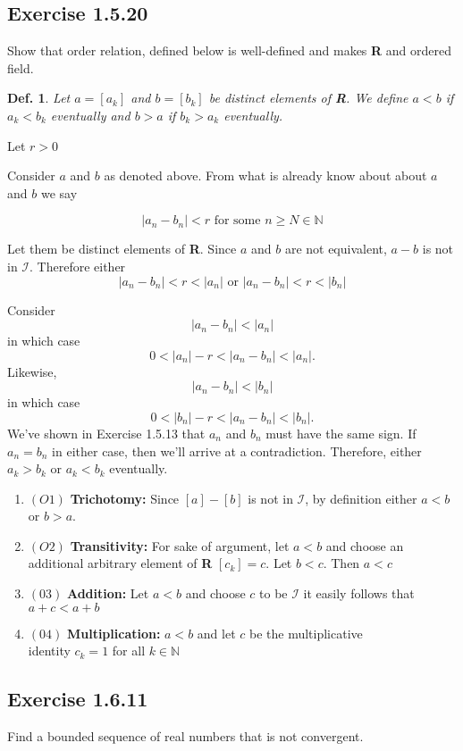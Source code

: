 \documentclass{tufte-book}
\theoremstyle{mytheoremstyle}
\theoremstyle{mylemstyle}
\theoremstyle{mydefstyle}
\newtheorem*{mydef}{Def.}
\begin{document}
\subsection{Exercise 1.5.20}
Show that order relation, defined below is well-defined and makes \textbf{R} and ordered field. 

\begin{mydef}Let $a = [a_k]$ and $b=[b_k]$ be distinct elements of \textbf{R}. We define $a<b$ if $a_k < b_k$ eventually and $b>a$ if $b_k > a_k$ eventually.
\end{mydef}

Let $r > 0$


Consider $a$ and $b$ as denoted above. From what is already know about about $a$ and $b$ we say

\[|a_n - b_n| < r \text{ for some } n \geq N \in \mathbb{N}\] 

Let them be distinct elements of \textbf{R}. Since $a$ and $b$ are not equivalent, $a-b$ is not in $\mathcal{I}$. Therefore either
\[|a_n - b_n| < r < |a_n| \text{ or } |a_n - b_n| < r < |b_n| \]

Consider
\[|a_n-b_n| < |a_n|\]
in which case
\[0 < |a_n| - r < |a_n-b_n| < |a_n| .\]
Likewise,
\[|a_n-b_n| < |b_n|\]
in which case
\[0 < |b_n| - r < |a_n-b_n| < |b_n| .\]
We've shown in Exercise 1.5.13 that $a_n$ and $b_n$ must have the same sign. If $a_n=b_n$ in either case, then we'll arrive at a contradiction.  Therefore, either $a_k > b_k$ or $a_k<b_k$ eventually.
\begin{enumerate}
\item $(O1)$ \textbf{Trichotomy:}  Since $[a] - [b]$ is not in $\mathcal{I}$, by definition either $a < b$ or $b > a$.

\item $(O2)$ \textbf{Transitivity:} For sake of argument, let $a < b$ and choose an additional arbitrary element of \textbf{R} $[c_k] = c$. Let $b < c$. Then $a < c$

\item $(03)$ \textbf{Addition:} Let $a < b$ and choose $c$ to be $\mathcal{I}$ it easily follows that $a + c < a + b$

\item $(04)$ \textbf{Multiplication:} $a < b$ and let $c$ be the multiplicative\\ identity $c_k=1$ for all $k \in \mathbb{N}$
\end{enumerate}


\subsection{Exercise 1.6.11}
Find a bounded sequence of real numbers that is not convergent.
\end{document}

